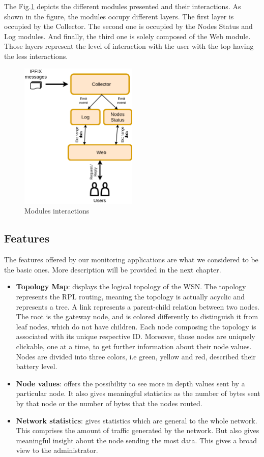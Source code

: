 The Fig.\ref{fig:modules} depicts the different modules presented and their interactions. As shown in the figure, the modules occupy different layers. The first layer is occupied by the Collector. The second one is occupied by the Nodes Status and Log modules. And finally, the third one is solely composed of the Web module. Those layers represent the level of interaction with the user with the top having the less interactions.

\begin{figure}
	\centering
	\includegraphics[width=0.5\textwidth]{res/modules.png}
	\caption{Modules interactions}
	\label{fig:modules}
\end{figure}

\subsection{Features}

The features offered by our monitoring applications are what we considered to be the basic ones. More description will be provided in the next chapter.

\begin{itemize}
	\item \textbf{Topology Map}: displays the logical topology of the WSN. The topology represents the RPL routing, meaning the topology is actually acyclic and represents a tree. A link represents a parent-child relation between two nodes. The root is the gateway node, and is colored differently to distinguish it from leaf nodes, which do not have children. Each node composing the topology is associated with its unique respective ID. Moreover, those nodes are uniquely clickable, one at a time, to get further information about their node values. Nodes are divided into three colors, i.e green, yellow and red, described their battery level.
	\item \textbf{Node values}: offers the possibility to see more in depth values sent by a particular node. It also gives meaningful statistics as the number of bytes sent by that node or the number of bytes that the nodes routed.
	\item \textbf{Network statistics}: gives statistics which are general to the whole network. This comprises the amount of traffic generated by the network. But also gives meaningful insight about the node sending the most data. This gives a broad view to the administrator.
\end{itemize}

